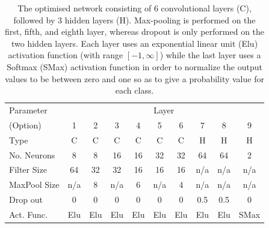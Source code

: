 \begin{table}[]
\centering
\begin{tabular}{lccccccccc}
\hline
\hline
Parameter & \multicolumn{9}{c}{Layer}\\
\cline{2-10}
(Option) & 1 & 2 & 3 & 4 & 5 & 6 & 7 & 8 & 9 \\
\hline
Type & C & C & C & C & C & C & H & H & H \\
No. Neurons  & 8  & 8  & 16 & 16 & 32 & 32 & 64  & 64  & 2  \\
Filter Size  & 64 & 32 & 32 & 16 & 16  & 16  & n/a & n/a & n/a  \\
MaxPool Size & n/a & 8 & n/a & 6 & n/a & 4 & n/a & n/a & n/a \\
Drop out  & 0 & 0 & 0 & 0 & 0 & 0 & 0.5 & 0.5 & 0 \\
Act. Func. & Elu & Elu & Elu & Elu & Elu & Elu & Elu & Elu & SMax \\
\hline
\end{tabular}
\caption[CNN optimised network configuration consisting of 6 convolutional layers (C), followed by 3 hidden layers (H).]{The optimised network consisting of 6 convolutional layers (C), followed by 3 hidden layers (H). Max-pooling is performed on the first, fifth, and eighth layer, whereas dropout is only performed on the two hidden layers. Each layer uses an exponential linear unit (Elu) activation function (with range $[-1,\infty]$) while the last layer uses a Softmax (SMax) activation function in order to normalize the output values to be between zero and one so as to give a probability value for each class.\label{table:network}}
\end{table}

%
%
